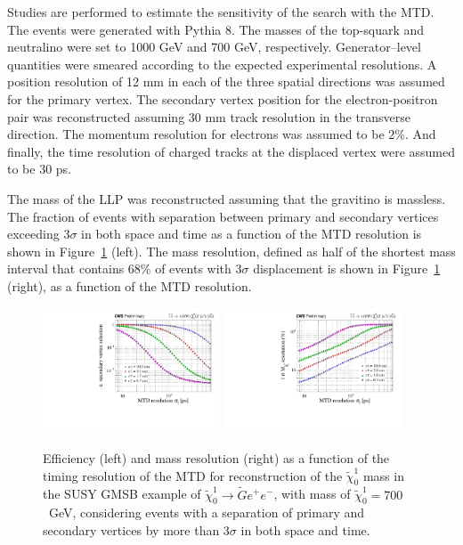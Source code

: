 Studies are performed to estimate the sensitivity of the search with the MTD.
The events were generated with Pythia 8. The masses of the top-squark and neutralino were set to 1000 GeV and 700 GeV, respectively. 
Generator–level quantities were smeared according to the expected experimental resolutions. 
A position resolution of 12 mm in each of the three spatial directions was assumed for the primary vertex.
 The secondary vertex position for the electron-positron pair was reconstructed assuming 30 mm track resolution in the transverse direction. 
The momentum resolution for electrons was assumed to be $2\%$. 
And finally, the time resolution of charged tracks at the displaced vertex were assumed to be 30 ps.

The mass of the LLP was reconstructed assuming that the gravitino is massless. The fraction of events with separation between primary and secondary
vertices exceeding 3$\sigma$ in both space and time as a function of the MTD resolution is shown in
Figure~\ref{fig:cmsupgrade_mtd} (left). The mass resolution, defined as half of the shortest mass interval that contains $68\%$ of events with 3$\sigma$ displacement is shown in Figure~\ref{fig:cmsupgrade_mtd} (right), 
as a function of the MTD resolution. 

\begin{figure}[t]\begin{center}
\includegraphics[width=0.47\textwidth]{figures/MTD/171025_52.pdf}
\includegraphics[width=0.47\textwidth]{figures/MTD/171025_53.pdf}
\caption{ 
Efficiency (left) and mass resolution (right) as a function of the timing resolution of the MTD for reconstruction of the $\tilde{\chi}_0^1$ mass in the SUSY GMSB example of $\tilde{\chi}_0^1 \to \tilde{G} e^{+} e^{-}$, with
mass of $\tilde{\chi}_0^1=700$~GeV, considering events with a separation of primary and secondary vertices by more than $3\sigma$ in both space and time.
}
\label{fig:cmsupgrade_mtd}
\end{center}
\end{figure}

